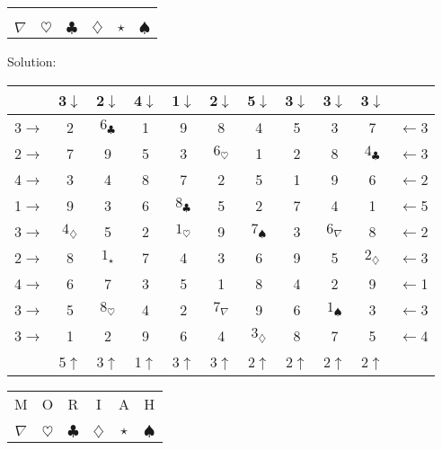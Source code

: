 \documentclass[12pt]{amsart}
\theoremstyle{definition}
\begin{document}
\begin{center}
\begin{tabular}{c c c c c c}
 & \\
\underline{\phantom{xyz}} & \underline{\phantom{xyz}} & \underline{\phantom{xyz}} & \underline{\phantom{xyz}} & \underline{\phantom{xyz}} & \underline{\phantom{xyz}}\\
$\nabla$ & $\heartsuit$ & $\clubsuit$ & $\diamondsuit$ & $\star$ & $\spadesuit$
\end{tabular}
\end{center}

\newpage

Solution:
\begin{center}\Large
\begin{tabular}{c||c|c|c||c|c|c||c|c|c||c}
  & 3\(\downarrow\) & 2\(\downarrow\) & 4\(\downarrow\) & 1\(\downarrow\) & 2\(\downarrow\) & 5\(\downarrow\) & 3\(\downarrow\) & 3\(\downarrow\) & 3\(\downarrow\) &   \\\hline\hline
3\(\rightarrow\) & 2 & $6_\clubsuit$ & 1 & 9 & 8 & 4 & 5 & 3 & 7 & \(\leftarrow\)3 \\\hline
2\(\rightarrow\) & 7 & 9 & 5 & 3 & $6_\heartsuit$ & 1 & 2 & 8 & $4_\clubsuit$ & \(\leftarrow\)3 \\\hline
4\(\rightarrow\) & 3 & 4 & 8 & 7 & 2 & 5 & 1 & 9 & 6 & \(\leftarrow\)2 \\\hline\hline
1\(\rightarrow\) & 9 & 3 & 6 & $8_\clubsuit$ & 5 & 2 & 7 & 4 & 1 & \(\leftarrow\)5 \\\hline
3\(\rightarrow\) & $4_\diamondsuit$ & 5 & 2 & $1_\heartsuit$ & 9 & $7_\spadesuit$ & 3 & $6_\nabla$ & 8 & \(\leftarrow\)2 \\\hline
2\(\rightarrow\) & 8 & $1_\star$ & 7 & 4 & 3 & 6 & 9 & 5 & $2_\diamondsuit$ & \(\leftarrow\)3 \\\hline\hline
4\(\rightarrow\) & 6 & 7 & 3 & 5 & 1 & 8 & 4 & 2 & 9 & \(\leftarrow\)1 \\\hline
3\(\rightarrow\) & 5 & $8_\heartsuit$ & 4 & 2 & $7_\nabla$ & 9 & 6 & $1_\spadesuit$ & 3 & \(\leftarrow\)3 \\\hline
3\(\rightarrow\) & 1 & 2 & 9 & 6 & 4 & $3_\diamondsuit$ & 8 & 7 & 5 & \(\leftarrow\)4 \\\hline\hline
  & 5\(\uparrow\) & 3\(\uparrow\) & 1\(\uparrow\) & 3\(\uparrow\) & 3\(\uparrow\) & 2\(\uparrow\) & 2\(\uparrow\) & 2\(\uparrow\) & 2\(\uparrow\) &
\end{tabular}
\end{center}

\vspace{.5in}

\begin{center}
\begin{tabular}{c c c c c c}
M & O & R & I & A & H\\
\underline{\phantom{xyz}} & \underline{\phantom{xyz}} & \underline{\phantom{xyz}} & \underline{\phantom{xyz}} & \underline{\phantom{xyz}} & \underline{\phantom{xyz}}\\
$\nabla$ & $\heartsuit$ & $\clubsuit$ & $\diamondsuit$ & $\star$ & $\spadesuit$
\end{tabular}
\end{center}

\end{document}
